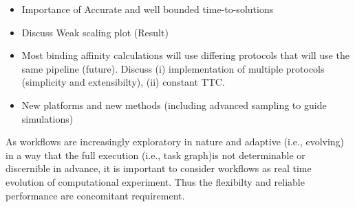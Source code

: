 
\begin{itemize}
	\item  Importance of Accurate and well bounded time-to-solutions 

	\item  Discuss Weak scaling plot (Result)

	\item  Most binding affinity calculations will use differing protocols that will use the same pipeline (future). Discuss (i) implementation of multiple protocols  (simplicity and extensibilty), (ii) constant TTC.

	\item  New platforms and new methods (including advanced sampling to guide simulations)

\end{itemize}


As workflows are increasingly exploratory in nature and adaptive (i.e.,
evolving) in a way that the full execution (i.e., task graph)is not
determinable or discernible in advance, it is important to consider 
workflows as real time evolution of computational experiment. Thus the
flexibilty and reliable performance are concomitant requirement.
